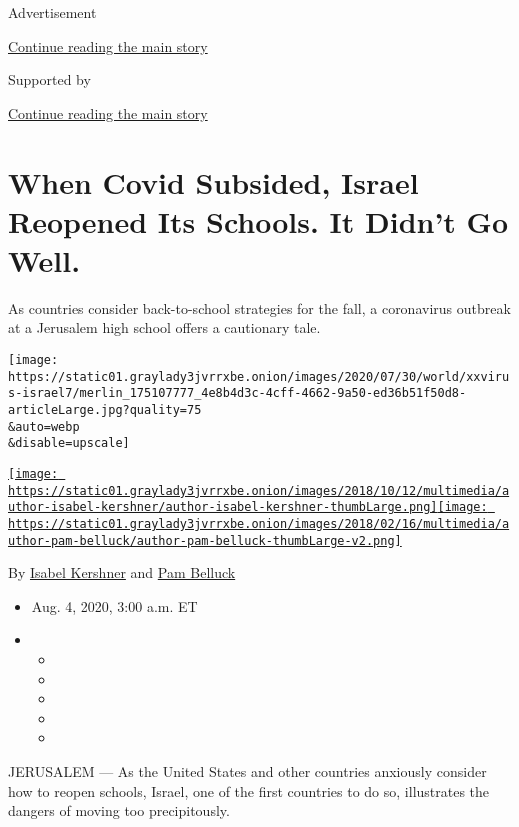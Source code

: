 Advertisement

\protect\hyperlink{after-top}{Continue reading the main story}

Supported by

\protect\hyperlink{after-sponsor}{Continue reading the main story}

\hypertarget{when-covid-subsided-israel-reopened-its-schools-it-didnt-go-well}{%
\section{When Covid Subsided, Israel Reopened Its Schools. It Didn't Go
Well.}\label{when-covid-subsided-israel-reopened-its-schools-it-didnt-go-well}}

As countries consider back-to-school strategies for the fall, a
coronavirus outbreak at a Jerusalem high school offers a cautionary
tale.

\texttt{[image: https://static01.graylady3jvrrxbe.onion/images/2020/07/30/world/xxvirus-israel7/merlin\_175107777\_4e8b4d3c-4cff-4662-9a50-ed36b51f50d8-articleLarge.jpg?quality=75\\\&auto=webp\\\&disable=upscale]}

\href{https://www.nytimes3xbfgragh.onion/by/isabel-kershner}{\texttt{[image: https://static01.graylady3jvrrxbe.onion/images/2018/10/12/multimedia/author-isabel-kershner/author-isabel-kershner-thumbLarge.png]}}\href{https://www.nytimes3xbfgragh.onion/by/pam-belluck}{\texttt{[image: https://static01.graylady3jvrrxbe.onion/images/2018/02/16/multimedia/author-pam-belluck/author-pam-belluck-thumbLarge-v2.png]}}

By \href{https://www.nytimes3xbfgragh.onion/by/isabel-kershner}{Isabel
Kershner} and
\href{https://www.nytimes3xbfgragh.onion/by/pam-belluck}{Pam Belluck}

\begin{itemize}
\item
  Aug. 4, 2020, 3:00 a.m. ET
\item
  \begin{itemize}
  \item
  \item
  \item
  \item
  \item
  \end{itemize}
\end{itemize}

JERUSALEM --- As the United States and other countries anxiously
consider how to reopen schools, Israel, one of the first countries to do
so, illustrates the dangers of moving too precipitously.

